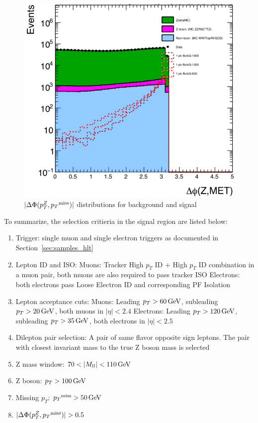 \begin{figure}[htbp]
\begin{center}
\includegraphics[width=0.75\linewidth]{figures/sel_deltaPhi_ZMET.png}
\caption{$|\Delta \Phi (p_T ^Z ,{p_T}^\text{miss})|$ distributions for background and signal}
\label{fig:fig:sel_deltphi}
\end{center}
\end{figure}


\vspace{0.3cm}
To summarize, the selection critieria in the signal region are listed below:
\begin{enumerate}
\item Trigger: single muon and single electron triggers as documented in Section~\ref{sec:samples_hlt}
\item Lepton ID and ISO:
  \subitem Muons: Tracker High $p_T$ ID $+$ High $p_T$ ID combination in a muon pair, 
  both muons are also required to pass tracker ISO
  \subitem Electrons: both electrons pass Loose Electron ID and corresponding PF Isolation
\item Lepton acceptance cuts:
  \subitem Muons: Leading  $p_T > 60\,\text{Ge\hspace{-.08em}V}$, subleading $p_T > 20\,\text{Ge\hspace{-.08em}V}$, both muons in $|\eta| < 2.4$
  \subitem Electrons: Leading $p_T >120\,\text{Ge\hspace{-.08em}V}$, subleading $p_T >35\,\text{Ge\hspace{-.08em}V}$, both electrons in $|\eta|<2.5$
\item Dilepton pair selection: A pair of same flavor opposite sign
  leptons. The pair with closest invariant mass to the true Z boson mass is selected
\item Z mass window:   $70 < |M_{ll}| < 110\,\text{Ge\hspace{-.08em}V}$
\item Z boson: $p_T >100\,\text{Ge\hspace{-.08em}V}$
\item Missing $p_T$: ${p_T}^\text{miss} > 50\,\text{Ge\hspace{-.08em}V}$
\item $|\Delta \Phi (p_T ^Z ,\ptmiss)|>0.5$
\end{enumerate}

